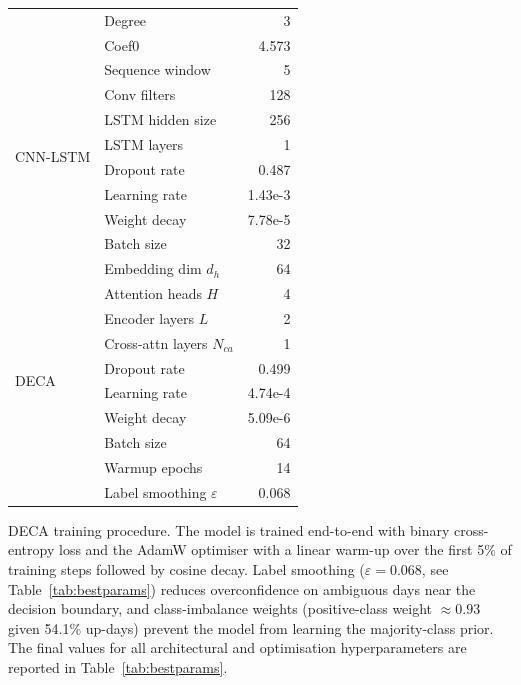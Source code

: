 \documentclass[final,3p,times,authoryear]{elsarticle}
\begin{document}
\begin{table}[H]
\begin{minipage}[t]{0.47\linewidth}
\begin{tabular}{llr}
  & Degree                  & 3         \\
  & Coef0                   & 4.573     \\
\hline
\multirow{8}{*}{CNN-LSTM}
  & Sequence window         & 5         \\
  & Conv filters            & 128       \\
  & LSTM hidden size        & 256       \\
  & LSTM layers             & 1         \\
  & Dropout rate            & 0.487     \\
  & Learning rate           & 1.43e{-3} \\
  & Weight decay            & 7.78e{-5} \\
  & Batch size              & 32        \\
\hline
\multirow{10}{*}{DECA}
  & Embedding dim $d_h$     & 64        \\
  & Attention heads $H$     & 4         \\
  & Encoder layers $L$      & 2         \\
  & Cross-attn layers $N_{ca}$ & 1      \\
  & Dropout rate            & 0.499     \\
  & Learning rate           & 4.74e{-4} \\
  & Weight decay            & 5.09e{-6} \\
  & Batch size              & 64        \\
  & Warmup epochs           & 14        \\
  & Label smoothing $\varepsilon$ & 0.068 \\
\hline
\end{tabular}
\end{minipage}
\end{table}

\noindent DECA training procedure.
The model is trained end-to-end with binary cross-entropy loss
\citep{muller2019labelsmoothing} and the AdamW optimiser
\citep{loshchilov2017adamw} with a linear warm-up over the first 5\%
of training steps followed by cosine decay.
Label smoothing ($\varepsilon = 0.068$, see Table~\ref{tab:bestparams})
reduces overconfidence on ambiguous days near the decision boundary, and
class-imbalance weights (positive-class weight $\approx 0.93$ given
54.1\% up-days) prevent the model from learning the majority-class prior.
The final values for all architectural and optimisation hyperparameters
are reported in Table~\ref{tab:bestparams}.
\end{document}
